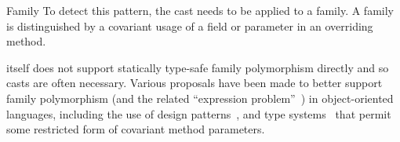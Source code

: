 \begin{pattern}{Family}
\detection{}
To detect this pattern, the cast needs to be applied to a family.
A family is distinguished by a covariant usage of a field or parameter in an overriding method.


\issues{}
\java{} itself does not support statically type-safe family polymorphism directly and so casts are often necessary.
Various proposals have been made to better support family polymorphism 
(and the related ``expression problem''~\citep{Wadler98ExpressionProblem}) 
in object-oriented languages,
including the use of design patterns~\citep{WangOliveira16ExpressionProblem, oliveiraExtensibilityMasses2012, nystromPolyglotExtensibleCompiler2003},
and type systems~\citep{gbeta, scalaIndependentlyExtensible,
Myers2006SoftwareCW, olivieraDisjointIntersectionTypes,
funWithTypeFunctionsKiselyov09} that
permit some restricted form of covariant method parameters.

\end{pattern}